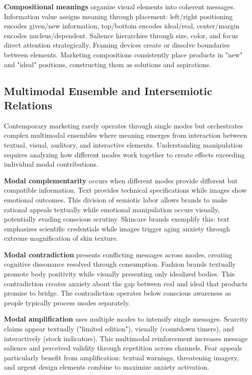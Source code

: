 \textbf{Compositional meanings} organize visual elements into coherent messages. Information value assigns meaning through placement: left/right positioning encodes given/new information, top/bottom encodes ideal/real, center/margin encodes nucleus/dependent. Salience hierarchies through size, color, and focus direct attention strategically. Framing devices create or dissolve boundaries between elements. Marketing compositions consistently place products in "new" and "ideal" positions, constructing them as solutions and aspirations.

\subsection{Multimodal Ensemble and Intersemiotic Relations}

Contemporary marketing rarely operates through single modes but orchestrates complex multimodal ensembles where meaning emerges from interaction between textual, visual, auditory, and interactive elements. Understanding manipulation requires analyzing how different modes work together to create effects exceeding individual modal contributions.

\textbf{Modal complementarity} occurs when different modes provide different but compatible information. Text provides technical specifications while images show emotional outcomes. This division of semiotic labor allows brands to make rational appeals textually while emotional manipulation occurs visually, potentially evading conscious scrutiny. Skincare brands exemplify this: text emphasizes scientific credentials while images trigger aging anxiety through extreme magnification of skin texture.

\textbf{Modal contradiction} presents conflicting messages across modes, creating cognitive dissonance resolved through consumption. Fashion brands textually promote body positivity while visually presenting only idealized bodies. This contradiction creates anxiety about the gap between real and ideal that products promise to bridge. The contradiction operates below conscious awareness as people typically process modes separately.

\textbf{Modal amplification} uses multiple modes to intensify single messages. Scarcity claims appear textually ("limited edition"), visually (countdown timers), and interactively (stock indicators). This multimodal reinforcement increases message salience and perceived validity through repetition across channels. Fear appeals particularly benefit from amplification: textual warnings, threatening imagery, and urgent design elements combine to maximize anxiety activation.

